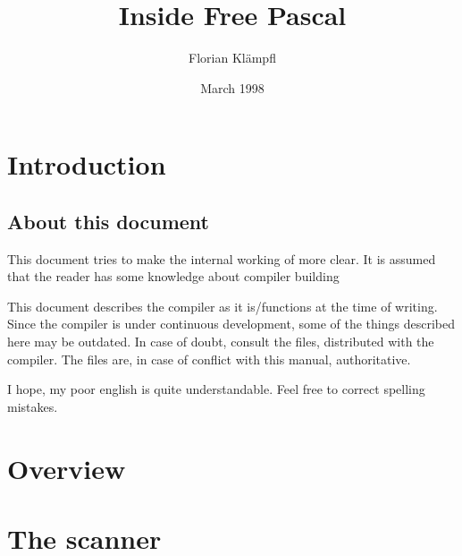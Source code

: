 \documentclass{report}
\begin{document}
\title{Inside Free Pascal}
\date{March 1998}
\author{Florian Kl\"ampfl}
\maketitle
\tableofcontents

\chapter{Introduction}

\section{About this document}

This document tries to make the internal working of \fpc more clear.
It is assumed that the reader has some knowledge about compiler
building

This document describes the compiler as it is/functions at the time of
writing. Since the compiler is under continuous development, some of the
things described here may be outdated. In case of doubt, consult the
 files, distributed with the compiler.
The  files are, in case of conflict with this manual,
 authoritative.

I hope, my poor english is quite understandable. Feel free to correct
spelling mistakes.

\chapter{Overview}

\chapter{The scanner}

\end{document}
